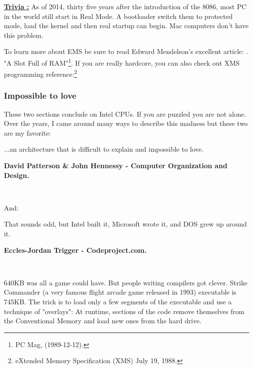 \documentclass[book.tex]{subfiles}
\begin{document}
\textbf{\underline{Trivia :}}  As of 2014, thirty five years after the introduction of the 8086, most PC in the world still start in Real Mode. A bootloader switch them to protected mode, load the kernel and then real startup can begin. Mac computers don't have this problem.

\bigskip
To learn more about EMS be sure to read Edward Mendelson's excellent article: . "A Slot Full of RAM"\footnote{PC Mag, (1989-12-12).}. If you are really hardcore, you can also check out XMS programming reference:\footnote{eXtended Memory Specification (XMS) July 19, 1988.}\\
\par

\subsubsection{Impossible to love}
These two sections conclude on Intel CPUs. If you are puzzled you are not alone. Over the years, I came around many ways to describe this madness but these two are my favorite:\\
\par
 \begin{fancyquotes}
   \lbrack...\rbrack an architecture that is difficult to explain and impossible to love.\\
   \par
\textbf{David Patterson \& John Hennessy - Computer Organization and Design.}
 \end{fancyquotes}\\
\par
And:
\par
 \begin{fancyquotes}
    That sounds odd, but Intel built it, Microsoft wrote it, and DOS grew up around it.\\
   \par
\textbf{Eccles-Jordan Trigger - Codeproject.com.}
 \end{fancyquotes}\\



\par
{} 640KB was all a game could have. But people writing compilers got clever. Strike Commander (a very famous flight arcade game released in 1993) executable is 745KB. The trick is to load only a few segments of the executable and use a technique of "overlays": At runtime, sections of the code remove themselves from the Conventional Memory and load new ones from the hard drive.
\end{document}
